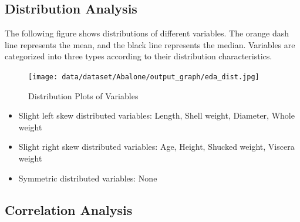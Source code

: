 \documentclass{article}
\begin{document}
\subsection{Distribution Analysis}
The following figure shows distributions of different variables. The orange dash line represents the mean, 
and the black line represents the median. Variables are categorized into three types according to their distribution characteristics.

\begin{figure}[H]
\centering
\texttt{[image: data/dataset/Abalone/output\_graph/eda\_dist.jpg]}
\caption{\label{fig:dist}Distribution Plots of Variables}
\end{figure}

\begin{itemize}
\item Slight left skew distributed variables: Length, Shell weight, Diameter, Whole weight
\item Slight right skew distributed variables: Age, Height, Shucked weight, Viscera weight
\item Symmetric distributed variables: None
\end{itemize}

\subsection{Correlation Analysis}
\end{document}
